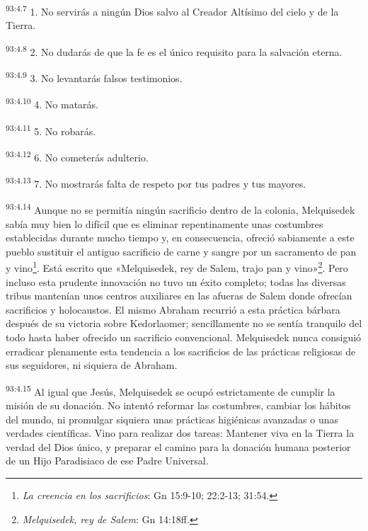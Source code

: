 \par
\textsuperscript{93:4.7} 1. No servirás a ningún Dios salvo al Creador Altísimo del cielo y de la Tierra.

\par
\textsuperscript{93:4.8} 2. No dudarás de que la fe es el único requisito para la salvación eterna.

\par
\textsuperscript{93:4.9} 3. No levantarás falsos testimonios.

\par
\textsuperscript{93:4.10} 4. No matarás.

\par
\textsuperscript{93:4.11} 5. No robarás.

\par
\textsuperscript{93:4.12} 6. No cometerás adulterio.

\par
\textsuperscript{93:4.13} 7. No mostrarás falta de respeto por tus padres y tus mayores.

\par
\textsuperscript{93:4.14} Aunque no se permitía ningún sacrificio dentro de la colonia, Melquisedek sabía muy bien lo difícil que es eliminar repentinamente unas costumbres establecidas durante mucho tiempo y, en consecuencia, ofreció sabiamente a este pueblo sustituir el antiguo sacrificio de carne y sangre por un sacramento de pan y vino\footnote{\textit{La creencia en los sacrificios}: Gn 15:9-10; 22:2-13; 31:54.}. Está escrito que «Melquisedek, rey de Salem, trajo pan y vino»\footnote{\textit{Melquisedek, rey de Salem}: Gn 14:18ff.}. Pero incluso esta prudente innovación no tuvo un éxito completo; todas las diversas tribus mantenían unos centros auxiliares en las afueras de Salem donde ofrecían sacrificios y holocaustos. El mismo Abraham recurrió a esta práctica bárbara después de su victoria sobre Kedorlaomer; sencillamente no se sentía tranquilo del todo hasta haber ofrecido un sacrificio convencional. Melquisedek nunca consiguió erradicar plenamente esta tendencia a los sacrificios de las prácticas religiosas de sus seguidores, ni siquiera de Abraham.

\par
\textsuperscript{93:4.15} Al igual que Jesús, Melquisedek se ocupó estrictamente de cumplir la misión de su donación. No intentó reformar las costumbres, cambiar los hábitos del mundo, ni promulgar siquiera unas prácticas higiénicas avanzadas o unas verdades científicas. Vino para realizar dos tareas: Mantener viva en la Tierra la verdad del Dios único, y preparar el camino para la donación humana posterior de un Hijo Paradisiaco de ese Padre Universal.

